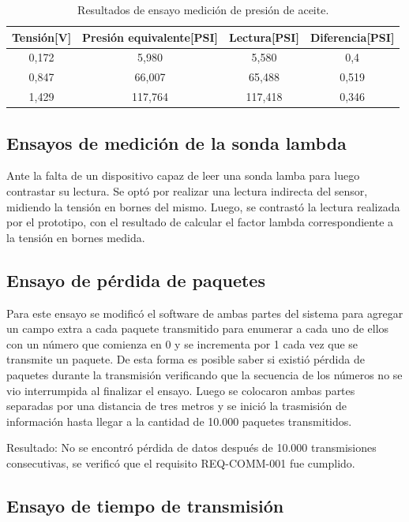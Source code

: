 \begin{table}[htpb]
	\centering
	\caption{Resultados de ensayo medición de presión de aceite.}
	\centering
	\begin{tabular}{c c c c}    
		\toprule
		\textbf{Tensión[V]} & \textbf{Presión equivalente[PSI]} & \textbf{Lectura[PSI]} & \textbf{Diferencia[PSI]}\\
		\midrule
		0,172		&   5,980 & 5,580 & 0,4 \\
		0,847		&   66,007 & 65,488 & 0,519 \\
		1,429		&   117,764 & 117,418 & 0,346 \\
		\bottomrule
	\end{tabular}
	\label{tab:ensayo-presion}
\end{table}

\subsection{Ensayos de medición de la sonda lambda}

Ante la falta de un dispositivo capaz de leer una sonda lamba para luego contrastar su lectura. Se optó por realizar una lectura indirecta del sensor, midiendo la tensión en bornes del mismo. Luego, se contrastó la lectura realizada por el prototipo, con el resultado de calcular el factor lambda correspondiente a la tensión en bornes medida.

\subsection{Ensayo de pérdida de paquetes}

Para este ensayo se modificó el software de ambas partes del sistema para agregar un campo extra a cada paquete transmitido para enumerar a cada uno de ellos con un número que comienza en 0 y se incrementa por 1 cada vez que se transmite un paquete. De esta forma es posible saber si existió pérdida de paquetes durante la transmisión verificando que la secuencia de los números no se vio interrumpida al finalizar el ensayo. Luego se colocaron ambas partes separadas por una distancia de tres metros y se inició la trasmisión de información hasta llegar a la cantidad de 10.000 paquetes transmitidos. 

Resultado: No se encontró pérdida de datos después de 10.000 transmisiones consecutivas, se verificó que el requisito REQ-COMM-001 fue cumplido.

\subsection{Ensayo de tiempo de transmisión}

